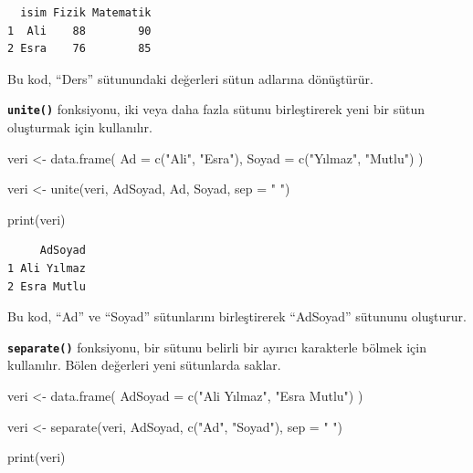 \documentclass[
  letterpaper,
  DIV=11,
  numbers=noendperiod]{scrreprt}
\newenvironment{Shaded}{\begin{snugshade}}{\end{snugshade}}
\newcommand{\AttributeTok}[1]{\textcolor[rgb]{0.40,0.45,0.13}{#1}}
\newcommand{\FunctionTok}[1]{\textcolor[rgb]{0.28,0.35,0.67}{#1}}
\newcommand{\NormalTok}[1]{\textcolor[rgb]{0.00,0.23,0.31}{#1}}
\newcommand{\OtherTok}[1]{\textcolor[rgb]{0.00,0.23,0.31}{#1}}
\newcommand{\StringTok}[1]{\textcolor[rgb]{0.13,0.47,0.30}{#1}}
\begin{document}
\begin{verbatim}
  isim Fizik Matematik
1  Ali    88        90
2 Esra    76        85
\end{verbatim}

Bu kod, ``Ders'' sütunundaki değerleri sütun adlarına dönüştürür.

\textbf{\texttt{unite()}} fonksiyonu, iki veya daha fazla sütunu
birleştirerek yeni bir sütun oluşturmak için kullanılır.

\begin{Shaded}
\begin{Highlighting}[]
\NormalTok{veri }\OtherTok{\textless{}{-}} \FunctionTok{data.frame}\NormalTok{(}
  \AttributeTok{Ad =} \FunctionTok{c}\NormalTok{(}\StringTok{"Ali"}\NormalTok{, }\StringTok{"Esra"}\NormalTok{),}
  \AttributeTok{Soyad =} \FunctionTok{c}\NormalTok{(}\StringTok{"Yılmaz"}\NormalTok{, }\StringTok{"Mutlu"}\NormalTok{)}
\NormalTok{)}

\NormalTok{veri }\OtherTok{\textless{}{-}} \FunctionTok{unite}\NormalTok{(veri, AdSoyad, Ad, Soyad, }\AttributeTok{sep =} \StringTok{" "}\NormalTok{)}

\FunctionTok{print}\NormalTok{(veri)}
\end{Highlighting}
\end{Shaded}

\begin{verbatim}
     AdSoyad
1 Ali Yılmaz
2 Esra Mutlu
\end{verbatim}

Bu kod, ``Ad'' ve ``Soyad'' sütunlarını birleştirerek ``AdSoyad''
sütununu oluşturur.

\textbf{\texttt{separate()}} fonksiyonu, bir sütunu belirli bir ayırıcı
karakterle bölmek için kullanılır. Bölen değerleri yeni sütunlarda
saklar.

\begin{Shaded}
\begin{Highlighting}[]
\NormalTok{veri }\OtherTok{\textless{}{-}} \FunctionTok{data.frame}\NormalTok{(}
  \AttributeTok{AdSoyad =} \FunctionTok{c}\NormalTok{(}\StringTok{"Ali Yılmaz"}\NormalTok{, }\StringTok{"Esra Mutlu"}\NormalTok{)}
\NormalTok{)}

\NormalTok{veri }\OtherTok{\textless{}{-}} \FunctionTok{separate}\NormalTok{(veri, AdSoyad, }\FunctionTok{c}\NormalTok{(}\StringTok{"Ad"}\NormalTok{, }\StringTok{"Soyad"}\NormalTok{), }\AttributeTok{sep =} \StringTok{" "}\NormalTok{)}

\FunctionTok{print}\NormalTok{(veri)}
\end{Highlighting}
\end{Shaded}
\end{document}

